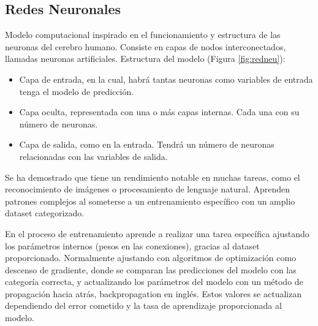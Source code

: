 	\subsection{Redes Neuronales}

		Modelo computacional inspirado en el funcionamiento y estructura de las neuronas del cerebro humano. Consiste en capas de nodos interconectados, llamadas neuronas artificiales. Estructura del modelo (Figura \ref{fig:redneu}):


		\begin{itemize}
			\item Capa de entrada, en la cual, habrá tantas neuronas como variables de entrada tenga el modelo de predicción.
			\vspace{-0.4cm} 
			\item Capa oculta, representada con una o más capas internas. Cada una con su número de neuronas.
			\vspace{-0.4cm}	
			\item Capa de salida, como en la entrada. Tendrá un número de neuronas relacionadas con las variables de salida.
		\end{itemize}
		
		\vspace{-0.2cm}
		
		Se ha demostrado que tiene un rendimiento notable en muchas tareas, como el reconocimiento de imágenes o procesamiento de lenguaje natural. Aprenden patrones complejos al someterse a un entrenamiento específico con un amplio dataset categorizado.	
		
		
		En el proceso de entrenamiento aprende a realizar una tarea específica ajustando los parámetros internos (pesos en las conexiones), gracias al dataset proporcionado. Normalmente ajustando con algoritmos de optimización como descenso de gradiente, donde se comparan las predicciones del modelo con las categoría correcta, y actualizando los parámetros del modelo con un método de propagación hacia atrás, backpropagation en inglés. Estos valores se actualizan dependiendo del error cometido y la tasa de aprendizaje proporcionada al modelo.



